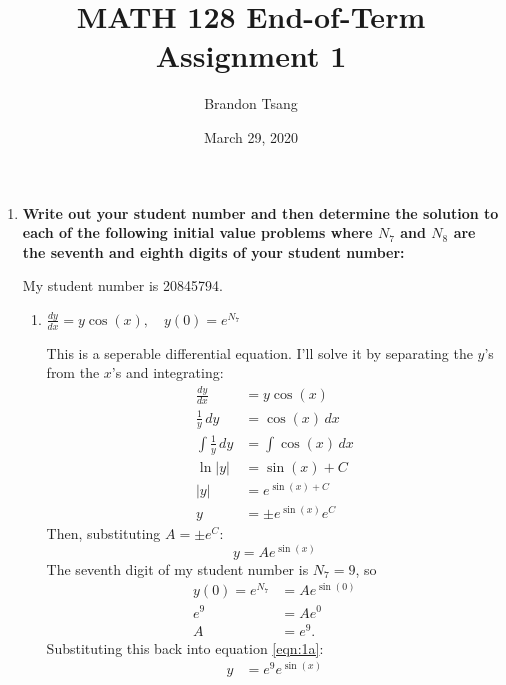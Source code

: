\documentclass[11pt]{article}
\title{MATH 128 End-of-Term Assignment 1}
\author{Brandon Tsang}
\date{March 29, 2020}
\begin{document}
    \maketitle
    \begin{enumerate}[label={\textbf{\arabic*.}}]
        \item{
            \textbf{\boldmath Write out your student number and then determine the solution to each of the following initial value problems where $N_7$ and $N_8$ are the seventh and eighth digits of your student number:}
            \par
            My student number is 20845794.
            \begin{enumerate}[label={\textbf{(\alph*)}}]
                \item{
                    \textbf{\boldmath $\frac{dy}{dx}=y\cos(x),\quad y(0)=e^{N_7}$}
                    \par
                    This is a seperable differential equation. I'll solve it by separating the $y$'s from the $x$'s and integrating:
                    \begin{align*}
                        \frac{dy}{dx}&=y\cos(x) \\
                        \frac{1}{y}\,dy&=\cos(x)\,dx \\
                        \int\frac{1}{y}\,dy&=\int\cos(x)\,dx \\
                        \ln|y|&=\sin(x)+C \\
                        |y|&=e^{\sin(x)+C} \\
                        y&=\pm e^{\sin(x)}e^C
                    \end{align*}
                    Then, substituting $A=\pm e^C$:
                    \begin{equation}
                        y=Ae^{\sin(x)} \label{eqn:1a}
                    \end{equation}
                    The seventh digit of my student number is $N_7=9$, so
                    \begin{align*}
                        y(0)=e^{N_7}&=Ae^{\sin(0)} \\
                        e^9&=Ae^0 \\
                        A&=e^9.
                    \end{align*}
                    Substituting this back into equation \ref{eqn:1a}:
                    \begin{align*}
                        y&=e^9e^{\sin(x)} \\

\end{align*}}
\end{enumerate}}
\end{enumerate}
\end{document}
